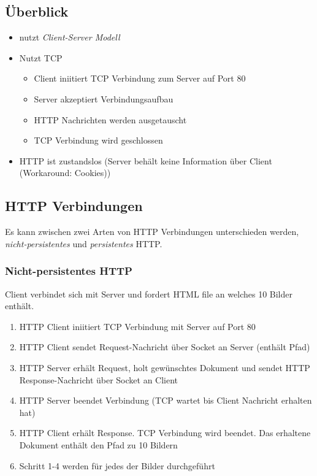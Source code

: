 \subsection{Überblick}
\begin{itemize}
    \item nutzt \emph{Client-Server Modell}
    \item Nutzt TCP \begin{itemize}
        \item Client iniitiert TCP Verbindung zum Server auf Port 80
        \item Server akzeptiert Verbindungsaufbau 
        \item HTTP Nachrichten werden ausgetauscht
        \item TCP Verbindung wird geschlossen
    \end{itemize}
    \item HTTP ist zustandslos (Server behält keine Information über Client (Workaround: Cookies))
\end{itemize}

\subsection{HTTP Verbindungen}
Es kann zwischen zwei Arten von HTTP Verbindungen unterschieden werden, \emph{nicht-persistentes} und \emph{persistentes} HTTP.
\subsubsection{Nicht-persistentes HTTP}
Client verbindet sich mit Server und fordert HTML file an welches 10 Bilder enthält.\\
\begin{enumerate}
    \item HTTP Client iniitiert TCP Verbindung mit Server auf Port 80
    \item HTTP Client sendet Request-Nachricht über Socket an Server (enthält Pfad)
    \item HTTP Server erhält Request, holt gewünschtes Dokument und sendet HTTP Response-Nachricht über Socket an Client
    \item HTTP Server beendet Verbindung (TCP wartet bis Client Nachricht erhalten hat)
    \item HTTP Client erhält Response. TCP Verbindung wird beendet. Das erhaltene Dokument enthält den Pfad zu 10 Bildern
    \item Schritt 1-4 werden für jedes der Bilder durchgeführt
\end{enumerate}

